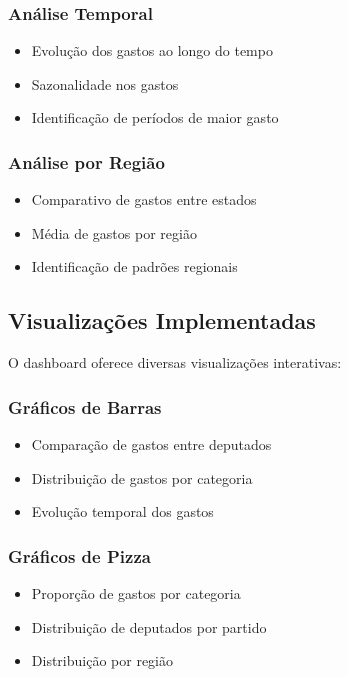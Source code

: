 \documentclass[12pt,a4paper]{article}
\begin{document}
\subsubsection{Análise Temporal}
\begin{itemize}
    \item Evolução dos gastos ao longo do tempo
    \item Sazonalidade nos gastos
    \item Identificação de períodos de maior gasto
\end{itemize}

\subsubsection{Análise por Região}
\begin{itemize}
    \item Comparativo de gastos entre estados
    \item Média de gastos por região
    \item Identificação de padrões regionais
\end{itemize}

\subsection{Visualizações Implementadas}
O dashboard oferece diversas visualizações interativas:

\subsubsection{Gráficos de Barras}
\begin{itemize}
    \item Comparação de gastos entre deputados
    \item Distribuição de gastos por categoria
    \item Evolução temporal dos gastos
\end{itemize}

\subsubsection{Gráficos de Pizza}
\begin{itemize}
    \item Proporção de gastos por categoria
    \item Distribuição de deputados por partido
    \item Distribuição por região
\end{itemize}
\end{document}
